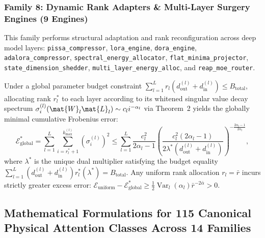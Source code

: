 \subsubsection{Family 8: Dynamic Rank Adapters \& Multi-Layer Surgery Engines (9 Engines)}
This family performs structural adaptation and rank reconfiguration across deep model layers: \texttt{pissa\_compressor}, \texttt{lora\_engine}, \texttt{dora\_engine}, \texttt{adalora\_compressor}, \texttt{spectral\_energy\_allocator}, \texttt{flat\_minima\_projector}, \texttt{state\_dimension\_shedder}, \texttt{multi\_layer\_energy\_alloc}, and \texttt{reap\_moe\_router}.
\begin{theorem}
\label{thm:frob_dynamic_rank_family}
Under a global parameter budget constraint $\sum_{l=1}^L r_l (d_{\text{out}}^{(l)} + d_{\text{in}}^{(l)}) \le B_{\text{total}}$, allocating rank $r_l^*$ to each layer according to its whitened singular value decay spectrum $\sigma_{i}^{(l)}(\mat{W}_l \mat{L}_l) \sim c_l i^{-\alpha_l}$ via Theorem~2 yields the globally minimal cumulative Frobenius error:
\begin{equation}
\mathcal{E}_{\text{global}}^* = \sum_{l=1}^L \sum_{i=r_l^*+1}^{k_{\max}^{(l)}} (\sigma_i^{(l)})^2 \le \sum_{l=1}^L \frac{c_l^2}{2\alpha_l - 1} \left( \frac{c_l^2 (2\alpha_l - 1)}{2 \lambda^* (d_{\text{out}}^{(l)} + d_{\text{in}}^{(l)})} \right)^{-\frac{2\alpha_l - 1}{2\alpha_l}},
\label{eq:frob_bound_dynamic_rank_family}
\end{equation}
where $\lambda^*$ is the unique dual multiplier satisfying the budget equality $\sum_{l=1}^L (d_{\text{out}}^{(l)} + d_{\text{in}}^{(l)}) r_l^*(\lambda^*) = B_{\text{total}}$. Any uniform rank allocation $r_l = \bar{r}$ incurs strictly greater excess error: $\mathcal{E}_{\text{uniform}} - \mathcal{E}_{\text{global}}^* \ge \frac{1}{2}\operatorname{Var}_l(\alpha_l) \bar{r}^{-2\bar{\alpha}} > 0$.
\end{theorem}

\subsection{Mathematical Formulations for 115 Canonical Physical Attention Classes Across 14 Families}
\label{sec:math_115_attentions}

